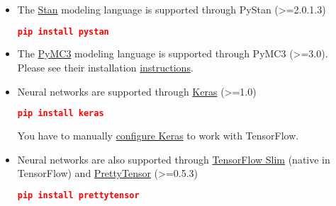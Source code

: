 \begin{itemize}
  \item The \href{http://mc-stan.org}{Stan} modeling language is supported
  through PyStan (>=2.0.1.3)
\begin{lstlisting}[language=JSON]
pip install pystan
\end{lstlisting}
  \item The \href{http://pymc-devs.github.io/pymc3/}{PyMC3} modeling language is supported
  through PyMC3 (>=3.0). Please see their installation
  \href{http://pymc-devs.github.io/pymc3/notebooks/getting_started.html}
  {instructions}.
  \item Neural networks are supported through
  \href{http://keras.io}{Keras} (>=1.0)
\begin{lstlisting}[language=JSON]
pip install keras
\end{lstlisting}
You have to manually \href{http://keras.io/#switching-from-theano-to-tensorflow}
{configure Keras} to work with TensorFlow.
\item Neural networks are also supported through
\href{https://github.com/tensorflow/tensorflow/tree/master/tensorflow/contrib/slim}{TensorFlow
Slim} (native in TensorFlow) and
\href{https://github.com/google/prettytensor}{PrettyTensor} (>=0.5.3)
\begin{lstlisting}[language=JSON]
pip install prettytensor
\end{lstlisting}
\end{itemize}
